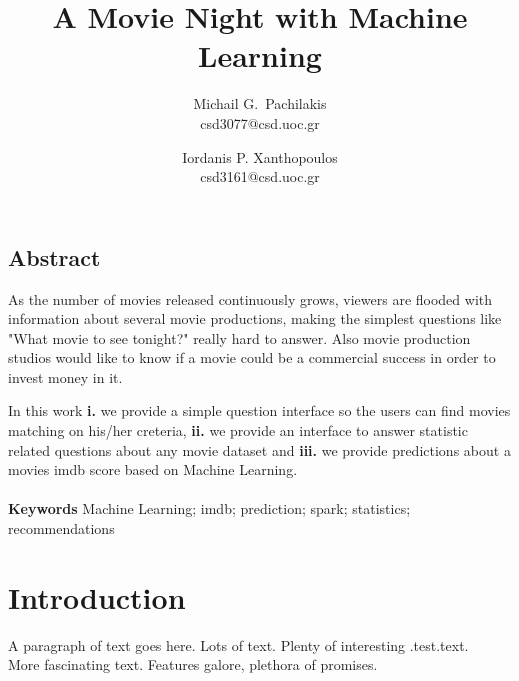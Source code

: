 \documentclass[letterpaper,twocolumn,10pt]{article}
\begin{document}
\date{}

\title{\Large \bf A Movie Night with Machine Learning}

\author{
{\rm Michail G.\ Pachilakis}\\
csd3077@csd.uoc.gr
\and
{\rm Iordanis P. Xanthopoulos}\\
csd3161@csd.uoc.gr
} %

\maketitle

\thispagestyle{empty}


\subsection*{Abstract}
\par As the number of movies released continuously grows, viewers are flooded with information about several movie productions, making the simplest questions like "What movie to see tonight?" really hard to answer. Also movie production studios would like to know if a movie could be a commercial success in order to invest money in it.\par In this work \textbf{i.} we provide a simple question interface so the users can find movies matching on his/her creteria, \textbf{ii.} we provide an interface to answer statistic related questions about any movie dataset and \textbf{iii.} we provide predictions about a movies imdb score based on Machine Learning.\\
\\
\textbf{Keywords} Machine Learning; imdb; prediction; spark; statistics; recommendations


\section{Introduction}

A paragraph of text goes here.  Lots of text.  Plenty of interesting
.test.text. \\ 

More fascinating text. Features galore, plethora of promises.\\
\end{document}
